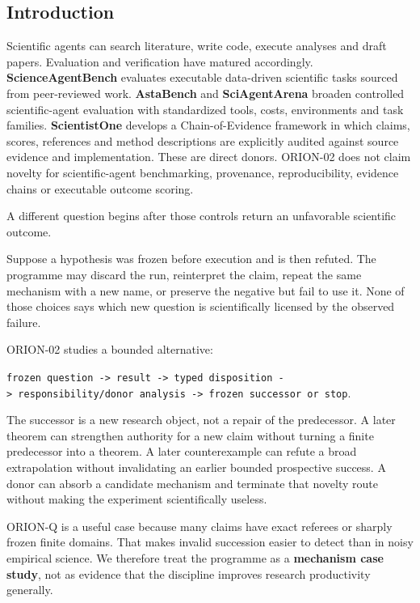 \documentclass[preprint,12pt]{elsarticle}
\begin{document}
\hypertarget{introduction}{%
\subsection{Introduction}\label{introduction}}

Scientific agents can search literature, write code, execute analyses
and draft papers. Evaluation and verification have matured accordingly.
\textbf{ScienceAgentBench} evaluates executable data-driven scientific
tasks sourced from peer-reviewed work. \textbf{AstaBench} and
\textbf{SciAgentArena} broaden controlled scientific-agent evaluation
with standardized tools, costs, environments and task families.
\textbf{ScientistOne} develops a Chain-of-Evidence framework in which
claims, scores, references and method descriptions are explicitly
audited against source evidence and implementation. These are direct
donors. ORION-02 does not claim novelty for scientific-agent
benchmarking, provenance, reproducibility, evidence chains or executable
outcome scoring.

A different question begins after those controls return an unfavorable
scientific outcome.

Suppose a hypothesis was frozen before execution and is then refuted.
The programme may discard the run, reinterpret the claim, repeat the
same mechanism with a new name, or preserve the negative but fail to use
it. None of those choices says which new question is scientifically
licensed by the observed failure.

ORION-02 studies a bounded alternative:

\texttt{frozen\ question\ -\textgreater{}\ result\ -\textgreater{}\ typed\ disposition\ -\textgreater{}\ responsibility/donor\ analysis\ -\textgreater{}\ frozen\ successor\ or\ stop}.

The successor is a new research object, not a repair of the predecessor.
A later theorem can strengthen authority for a new claim without turning
a finite predecessor into a theorem. A later counterexample can refute a
broad extrapolation without invalidating an earlier bounded prospective
success. A donor can absorb a candidate mechanism and terminate that
novelty route without making the experiment scientifically useless.

ORION-Q is a useful case because many claims have exact referees or
sharply frozen finite domains. That makes invalid succession easier to
detect than in noisy empirical science. We therefore treat the programme
as a \textbf{mechanism case study}, not as evidence that the discipline
improves research productivity generally.
\end{document}
